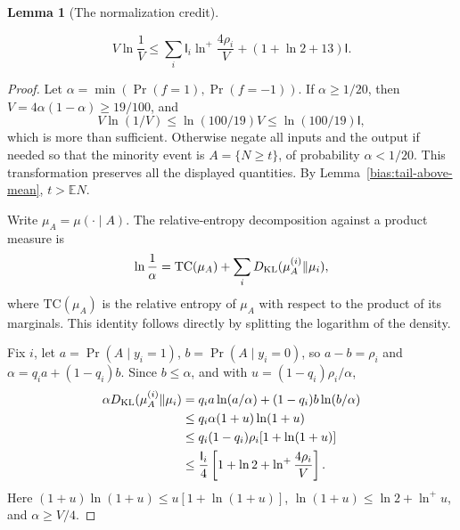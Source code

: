 \documentclass[11pt]{amsart}
\newtheorem{lemma}[theorem]{Lemma}
\theoremstyle{definition}
\theoremstyle{remark}
\newcommand{\I}{\mathsf I}
\begin{document}
\begin{lemma}[The normalization credit]\label{bias:credit}

\begin{equation}\label{bias:eq-4-2}
V\ln\frac1V
 \le\sum_i \I_i\ln^+\frac{4\rho_i}{V}
       +(1+\ln2+13)\I.
\end{equation}

\end{lemma}
\begin{proof}

Let \(\alpha=\min(\Pr(f=1),\Pr(f=-1))\). If \(\alpha\ge1/20\), then \(V=4\alpha(1-\alpha)\ge19/100\), and \[
 V\ln(1/V)\le\ln(100/19)V\le\ln(100/19)\I,
\] which is more than sufficient. Otherwise negate all inputs and the output if needed so that the minority event is \(A=\{N\ge t\}\), of probability \(\alpha<1/20\). This transformation preserves all the displayed quantities. By Lemma~\ref{bias:tail-above-mean}, \(t>\mathbb EN\).

Write \(\mu_A=\mu(\cdot\mid A)\). The relative-entropy decomposition against a product measure is \begin{equation}\label{bias:eq-4-3}
\ln\frac1\alpha
 =\mathrm{TC}(\mu_A)+
     \sum_i D_{\rm KL}(\mu_A^{(i)}\Vert\mu_i),
\end{equation} where \(\mathrm{TC}(\mu_A)\) is the relative entropy of \(\mu_A\) with respect to the product of its marginals. This identity follows directly by splitting the logarithm of the density.

Fix \(i\), let \(a=\Pr(A\mid y_i=1)\), \(b=\Pr(A\mid y_i=0)\), so \(a-b=\rho_i\) and \(\alpha=q_i a+(1-q_i)b\). Since \(b\le\alpha\), and with \(u=(1-q_i)\rho_i/\alpha\), \begin{equation}\label{bias:eq-4-4}
\begin{aligned}
 \alpha D_{\rm KL}(\mu_A^{(i)}\Vert\mu_i)
 &=q_i a\ln(a/\alpha)+(1-q_i)b\ln(b/\alpha)\\
 &\le q_i\alpha(1+u)\ln(1+u)\\
 &\le q_i(1-q_i)\rho_i[1+\ln(1+u)]\\
 &\le\frac{\I_i}{4}
       \left[1+\ln2+\ln^+\frac{4\rho_i}{V}\right].
 \end{aligned}
\end{equation} Here \((1+u)\ln(1+u)\le u[1+\ln(1+u)]\), \(\ln(1+u)\le\ln2+\ln^+u\), and \(\alpha\ge V/4\).


\end{proof}
\end{document}
